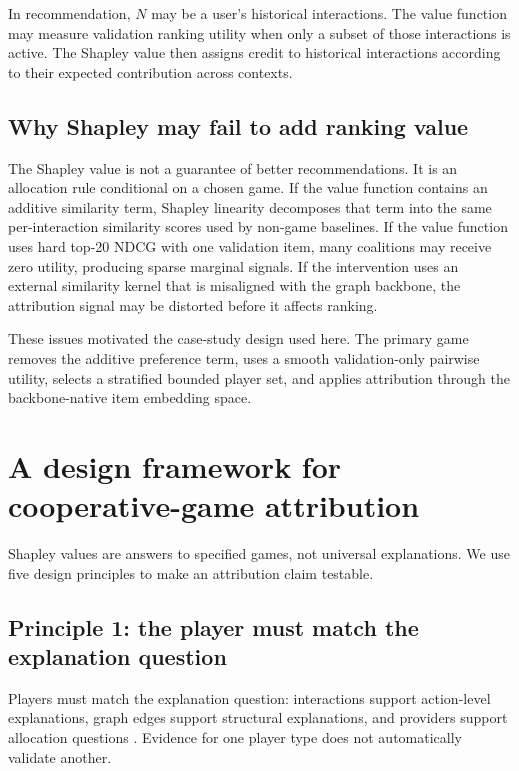 \documentclass[pdflatex,sn-mathphys-num]{sn-jnl}
\begin{document}
In recommendation, $N$ may be a user's historical interactions. The value function may measure validation ranking utility when only a subset of those interactions is active. The Shapley value then assigns credit to historical interactions according to their expected contribution across contexts.

\subsection{Why Shapley may fail to add ranking value}\label{subsec:shapley_limits}

The Shapley value is not a guarantee of better recommendations. It is an allocation rule conditional on a chosen game. If the value function contains an additive similarity term, Shapley linearity decomposes that term into the same per-interaction similarity scores used by non-game baselines. If the value function uses hard top-20 NDCG with one validation item, many coalitions may receive zero utility, producing sparse marginal signals. If the intervention uses an external similarity kernel that is misaligned with the graph backbone, the attribution signal may be distorted before it affects ranking.

These issues motivated the case-study design used here. The primary game removes the additive preference term, uses a smooth validation-only pairwise utility, selects a stratified bounded player set, and applies attribution through the backbone-native item embedding space.

\section{A design framework for cooperative-game attribution}\label{sec:design_framework}

Shapley values are answers to specified games, not universal explanations. We use five design principles to make an attribution claim testable.

\subsection{Principle 1: the player must match the explanation question}\label{subsec:principle_player}

Players must match the explanation question: interactions support action-level explanations, graph edges support structural explanations, and providers support allocation questions \cite{yuan2021explainability}. Evidence for one player type does not automatically validate another.
\end{document}
